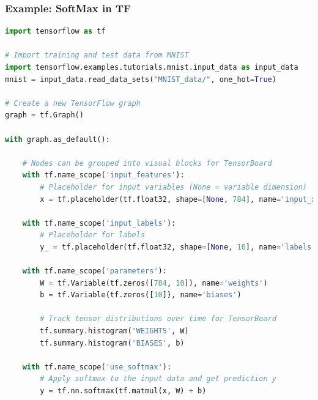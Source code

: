 \begin{frame}[fragile]
  \MyLogo
  \frametitle{Example: SoftMax in TF}  
 
\begin{lstlisting}[language=python]
import tensorflow as tf

# Import training and test data from MNIST
import tensorflow.examples.tutorials.mnist.input_data as input_data
mnist = input_data.read_data_sets("MNIST_data/", one_hot=True)

# Create a new TensorFlow graph
graph = tf.Graph()

with graph.as_default():

	# Nodes can be grouped into visual blocks for TensorBoard
	with tf.name_scope('input_features'):
		# Placeholder for input variables (None = variable dimension)
		x = tf.placeholder(tf.float32, shape=[None, 784], name='input_x')
							
	with tf.name_scope('input_labels'):
		# Placeholder for labels
		y_ = tf.placeholder(tf.float32, shape=[None, 10], name='labels')
							
	with tf.name_scope('parameters'):
		W = tf.Variable(tf.zeros([784, 10]), name='weights')
		b = tf.Variable(tf.zeros([10]), name='biases')
		
		# Track tensor distributions over time for TensorBoard
		tf.summary.histogram('WEIGHTS', W)
		tf.summary.histogram('BIASES', b)
			
	with tf.name_scope('use_softmax'):
		# Apply softmax to the input data and get prediction y
		y = tf.nn.softmax(tf.matmul(x, W) + b)
\end{lstlisting}

\end{frame}

